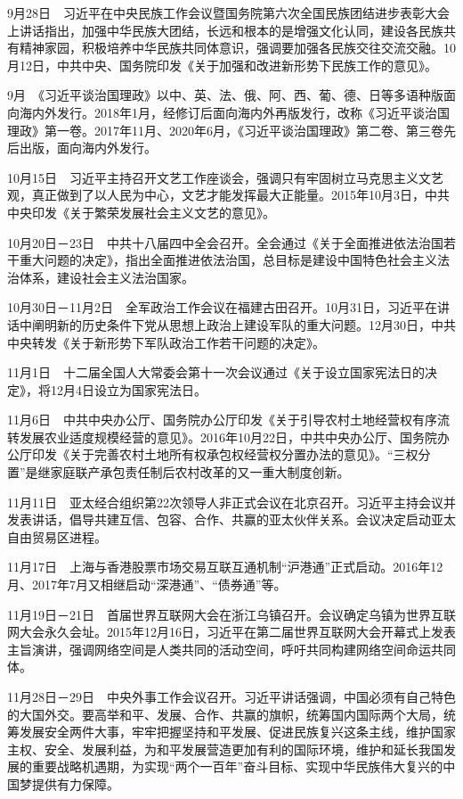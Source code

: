 \documentclass[10pt,a4paper,twocolumn]{book}
\begin{document}
9月28日　习近平在中央民族工作会议暨国务院第六次全国民族团结进步表彰大会上讲话指出，加强中华民族大团结，长远和根本的是增强文化认同，建设各民族共有精神家园，积极培养中华民族共同体意识，强调要加强各民族交往交流交融。10月12日，中共中央、国务院印发《关于加强和改进新形势下民族工作的意见》。

9月　《习近平谈治国理政》以中、英、法、俄、阿、西、葡、德、日等多语种版面向海内外发行。2018年1月，经修订后面向海内外再版发行，改称《习近平谈治国理政》第一卷。2017年11月、2020年6月，《习近平谈治国理政》第二卷、第三卷先后出版，面向海内外发行。

10月15日　习近平主持召开文艺工作座谈会，强调只有牢固树立马克思主义文艺观，真正做到了以人民为中心，文艺才能发挥最大正能量。2015年10月3日，中共中央印发《关于繁荣发展社会主义文艺的意见》。

10月20日－23日　中共十八届四中全会召开。全会通过《关于全面推进依法治国若干重大问题的决定》，指出全面推进依法治国，总目标是建设中国特色社会主义法治体系，建设社会主义法治国家。

10月30日－11月2日　全军政治工作会议在福建古田召开。10月31日，习近平在讲话中阐明新的历史条件下党从思想上政治上建设军队的重大问题。12月30日，中共中央转发《关于新形势下军队政治工作若干问题的决定》。

11月1日　十二届全国人大常委会第十一次会议通过《关于设立国家宪法日的决定》，将12月4日设立为国家宪法日。

11月6日　中共中央办公厅、国务院办公厅印发《关于引导农村土地经营权有序流转发展农业适度规模经营的意见》。2016年10月22日，中共中央办公厅、国务院办公厅印发《关于完善农村土地所有权承包权经营权分置办法的意见》。“三权分置”是继家庭联产承包责任制后农村改革的又一重大制度创新。

11月11日　亚太经合组织第22次领导人非正式会议在北京召开。习近平主持会议并发表讲话，倡导共建互信、包容、合作、共赢的亚太伙伴关系。会议决定启动亚太自由贸易区进程。

11月17日　上海与香港股票市场交易互联互通机制“沪港通”正式启动。2016年12月、2017年7月又相继启动“深港通”、“债券通”等。

11月19日－21日　首届世界互联网大会在浙江乌镇召开。会议确定乌镇为世界互联网大会永久会址。2015年12月16日，习近平在第二届世界互联网大会开幕式上发表主旨演讲，强调网络空间是人类共同的活动空间，呼吁共同构建网络空间命运共同体。

11月28日－29日　中央外事工作会议召开。习近平讲话强调，中国必须有自己特色的大国外交。要高举和平、发展、合作、共赢的旗帜，统筹国内国际两个大局，统筹发展安全两件大事，牢牢把握坚持和平发展、促进民族复兴这条主线，维护国家主权、安全、发展利益，为和平发展营造更加有利的国际环境，维护和延长我国发展的重要战略机遇期，为实现“两个一百年”奋斗目标、实现中华民族伟大复兴的中国梦提供有力保障。
\end{document}
